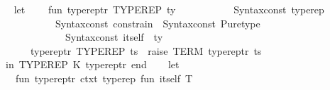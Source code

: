 \begin{isabellebody}
\isamarkupfalse%
\ {\isacartoucheopen}\isanewline
\ \ let\isanewline
\ \ \ \ fun\ typerep{\isacharunderscore}{\kern0pt}tr\ {\isacharparenleft}{\kern0pt}{\isacharasterisk}{\kern0pt}{\isachardoublequote}{\kern0pt}{\isacharunderscore}{\kern0pt}TYPEREP{\isachardoublequote}{\kern0pt}{\isacharasterisk}{\kern0pt}{\isacharparenright}{\kern0pt}\ {\isacharbrackleft}{\kern0pt}ty{\isacharbrackright}{\kern0pt}\ {\isacharequal}{\kern0pt}\isanewline
\ \ \ \ \ \ \ \ \ \ Syntax{\isachardot}{\kern0pt}const\ \isactrlconstUNDERSCOREsyntax {\isasymopen}typerep{\isasymclose}\ {\isachardollar}{\kern0pt}\isanewline
\ \ \ \ \ \ \ \ \ \ \ \ {\isacharparenleft}{\kern0pt}Syntax{\isachardot}{\kern0pt}const\ \isactrlsyntaxUNDERSCOREconst {\isasymopen}{\isacharunderscore}{\kern0pt}constrain{\isasymclose}\ {\isachardollar}{\kern0pt}\ Syntax{\isachardot}{\kern0pt}const\ \isactrlconstUNDERSCOREsyntax {\isasymopen}Pure{\isachardot}{\kern0pt}type{\isasymclose}\ {\isachardollar}{\kern0pt}\isanewline
\ \ \ \ \ \ \ \ \ \ \ \ \ \ {\isacharparenleft}{\kern0pt}Syntax{\isachardot}{\kern0pt}const\ \isactrltypeUNDERSCOREsyntax {\isasymopen}itself{\isasymclose}\ {\isachardollar}{\kern0pt}\ ty{\isacharparenright}{\kern0pt}{\isacharparenright}{\kern0pt}\isanewline
\ \ \ \ \ \ {\isacharbar}{\kern0pt}\ typerep{\isacharunderscore}{\kern0pt}tr\ {\isacharparenleft}{\kern0pt}{\isacharasterisk}{\kern0pt}{\isachardoublequote}{\kern0pt}{\isacharunderscore}{\kern0pt}TYPEREP{\isachardoublequote}{\kern0pt}{\isacharasterisk}{\kern0pt}{\isacharparenright}{\kern0pt}\ ts\ {\isacharequal}{\kern0pt}\ raise\ TERM\ {\isacharparenleft}{\kern0pt}{\isachardoublequote}{\kern0pt}typerep{\isacharunderscore}{\kern0pt}tr{\isachardoublequote}{\kern0pt}{\isacharcomma}{\kern0pt}\ ts{\isacharparenright}{\kern0pt}{\isacharsemicolon}{\kern0pt}\isanewline
\ \ in\ {\isacharbrackleft}{\kern0pt}{\isacharparenleft}{\kern0pt}\isactrlsyntaxUNDERSCOREconst {\isasymopen}{\isacharunderscore}{\kern0pt}TYPEREP{\isasymclose}{\isacharcomma}{\kern0pt}\ K\ typerep{\isacharunderscore}{\kern0pt}tr{\isacharparenright}{\kern0pt}{\isacharbrackright}{\kern0pt}\ end\isanewline
{\isacartoucheclose}\isanewline
\isanewline
{}\isamarkupfalse%
\ {\isacartoucheopen}\isanewline
\ \ let\isanewline
\ \ \ \ fun\ typerep{\isacharunderscore}{\kern0pt}tr{\isacharprime}{\kern0pt}\ ctxt\ {\isacharparenleft}{\kern0pt}{\isacharasterisk}{\kern0pt}{\isachardoublequote}{\kern0pt}typerep{\isachardoublequote}{\kern0pt}{\isacharasterisk}{\kern0pt}{\isacharparenright}{\kern0pt}\ \isactrlType {\isasymopen}fun\ \isactrlType {\isasymopen}itself\ T{\isasymclose}\ {\isacharunderscore}{\kern0pt}{\isasymclose}\isanewline

\end{isabellebody}
